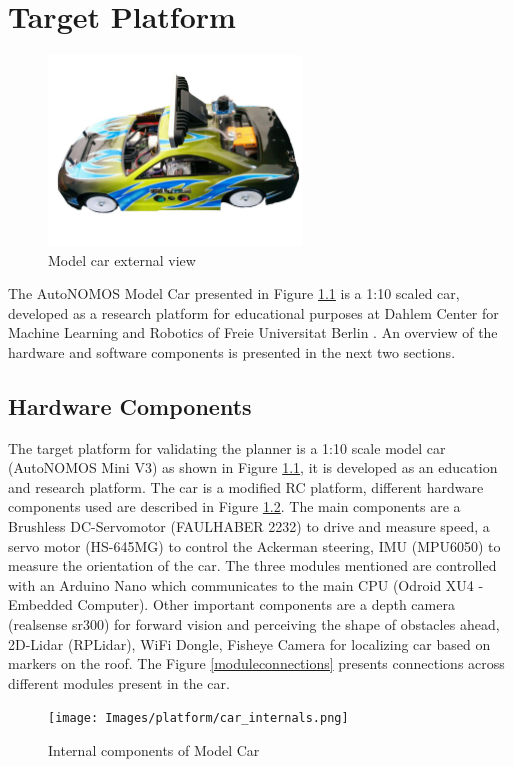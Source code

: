 \chapter{Target Platform}
\label{vehicle_info}

\begin{figure}[H]
	\centering
	\includegraphics[width=0.6\textwidth]{Images/platform/car.jpg}
	\caption{Model car external view}
	\label{model_car}
\end{figure}

The AutoNOMOS Model Car presented in Figure \ref{model_car} is a 1:10 scaled car, developed as a research platform for educational purposes at Dahlem Center for Machine Learning and Robotics of Freie Universitat Berlin \cite{dcmlr}. An overview of the hardware and software components is presented in the next two sections. 

\section{Hardware Components}
The target platform for validating the planner is a 1:10 scale model car (AutoNOMOS Mini V3) as shown in Figure \ref{model_car}, it is developed as an education and research platform. The car is a modified RC platform, different hardware components used are described in Figure \ref{internalcar}. The main components are a Brushless DC-Servomotor (FAULHABER 2232) to drive and measure speed, a servo motor (HS-645MG) to control the Ackerman steering, IMU (MPU6050) to measure the orientation of the car. The three modules mentioned are controlled with an Arduino Nano which communicates to the main CPU (Odroid XU4 - Embedded Computer). Other important components are a depth camera (realsense sr300) for forward vision and perceiving the shape of obstacles ahead, 2D-Lidar (RPLidar), WiFi Dongle, Fisheye Camera for localizing car based on markers on the roof. The Figure \ref{moduleconnections} presents connections across different modules present in the car.
\begin{figure}
	\centering
	\texttt{[image: Images/platform/car\_internals.png]}
	\caption{Internal components of Model Car \cite{model_car_archi}}
	\label{internalcar}
\end{figure}

